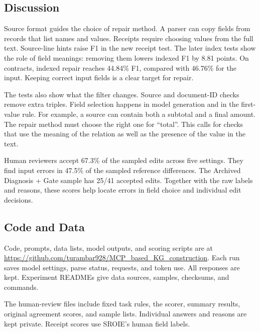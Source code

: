 \subsection{Discussion}
\label{sec:eval:failure}

Source format guides the choice of repair method.
A parser can copy fields from records that list names and values.
Receipts require choosing values from the full text. Source-line hints
raise F1 in the new receipt test. The later index tests show the role of
field meanings: removing them lowers indexed F1 by 8.81 points.
On contracts, indexed repair reaches 44.84\% F1, compared with 46.76\%
for the input. Keeping correct input fields is a clear target for repair.

The tests also show what the filter changes. Source and document-ID checks
remove extra triples. Field selection happens in model generation and in
the first-value rule. For example, a source can contain both a subtotal
and a final amount. The repair method must choose the right one for ``total''.
This calls for checks that use the meaning of the relation as well as the
presence of the value in the text.

Human reviewers accept 67.3\% of the sampled edits across five settings.
They find input errors in 47.5\% of the sampled reference differences.
The Archived Diagnosis + Gate sample has 25/41 accepted edits.
Together with the raw labels and reasons, these scores help locate errors
in field choice and individual edit decisions.

\subsection{Code and Data}

Code, prompts, data lists, model outputs, and scoring scripts are at
\url{https://github.com/turambar928/MCP_based_KG_construction}.
Each run saves model settings, parse status, requests, and token use.
All responses are kept. Experiment READMEs give data sources, samples,
checksums, and commands.

The human-review files include fixed task rules, the scorer, summary results,
original agreement scores, and sample lists. Individual answers and reasons
are kept private. Receipt scores use SROIE's human field labels.

